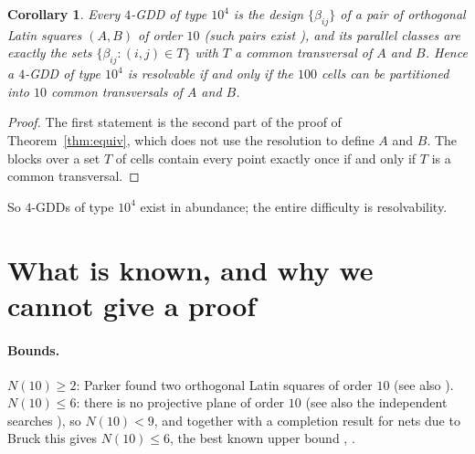\documentclass[11pt]{article}
\newtheorem{corollary}[theorem]{Corollary}
\theoremstyle{remark}
\begin{document}
\begin{corollary}\label{cor:gdd}
Every $4$-GDD of type $10^{4}$ is the design $\{\beta_{ij}\}$ of a pair of orthogonal
Latin squares $(A,B)$ of order $10$ (such pairs exist \cite{Par59,BSP60}), and its
parallel classes are exactly the sets $\{\beta_{ij}:(i,j)\in T\}$ with $T$ a common
transversal of $A$ and $B$.  Hence a $4$-GDD of type $10^{4}$ is resolvable if and only
if the $100$ cells can be partitioned into $10$ common transversals of $A$ and $B$.
\end{corollary}

\begin{proof}
The first statement is the second part of the proof of Theorem~\ref{thm:equiv}, which
does not use the resolution to define $A$ and $B$.  The blocks over a set $T$ of cells
contain every point exactly once if and only if $T$ is a common transversal.
\end{proof}

So $4$-GDDs of type $10^{4}$ exist in abundance; the entire difficulty is resolvability.

\section{What is known, and why we cannot give a proof}\label{sec:known}

\paragraph{Bounds.}  $N(10)\ge 2$: Parker \cite{Par59} found two orthogonal Latin squares
of order $10$ (see also \cite{BS59,BSP60}).  $N(10)\le 6$: there is no projective
plane of order $10$ \cite{LTS89} (see also the independent searches
\cite{Roy11,BCSKG21}), so $N(10)<9$, and together with a completion result for nets due
to Bruck \cite{Bru63} this gives $N(10)\le 6$, the best known upper bound
\cite[Section~2.4]{BKS26}, \cite{DH14}.
\end{document}
